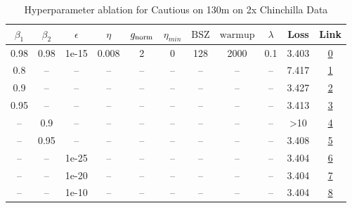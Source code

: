 \begin{table}[H]
\centering
\caption{Hyperparameter ablation for Cautious on 130m on 2x Chinchilla Data}
\label{tab:ablation_cautious_130m_on_2x_chinchilla_data}
\begin{tabular}{ccccccccccc}
\toprule
$\beta_1$ & $\beta_2$ & $\epsilon$ & $\eta$ & $g_{\mathrm{norm}}$ & $\eta_{min}$ & $\mathrm{BSZ}$ & $\mathrm{warmup}$ & $\lambda$ & Loss & Link \\
\midrule
0.98 & 0.98 & 1e-15 & 0.008 & 2 & 0 & 128 & 2000 & 0.1 & 3.403 & \href{https://wandb.ai/marin-community/optimizer-scaling/runs/sweep-130m-5B-cautiousce8123lr0.008-wd0.1-minlr0-warmup2000-b10.-fd1867}{0} \\
\midrule
0.8 & -- & -- & -- & -- & -- & -- & -- & -- & 7.417 & \href{https://wandb.ai/marin-community/optimizer-scaling/runs/sweep-130m-5B-cautious4f3b8flr0.008-wd0.1-minlr0-warmup2000-b10.-ef7ead}{1} \\
0.9 & -- & -- & -- & -- & -- & -- & -- & -- & 3.427 & \href{https://wandb.ai/marin-community/optimizer-scaling/runs/sweep-130m-5B-cautious585d63lr0.008-wd0.1-minlr0-warmup2000-b10.-6158ce}{2} \\
0.95 & -- & -- & -- & -- & -- & -- & -- & -- & 3.413 & \href{https://wandb.ai/marin-community/optimizer-scaling/runs/sweep-130m-5B-cautious5d7675lr0.008-wd0.1-minlr0-warmup2000-b10.-76a83d}{3} \\
-- & 0.9 & -- & -- & -- & -- & -- & -- & -- & >10 & \href{https://wandb.ai/marin-community/optimizer-scaling/runs/sweep-130m-5B-cautious6aa3ablr0.008-wd0.1-minlr0-warmup2000-b10.-752115}{4} \\
-- & 0.95 & -- & -- & -- & -- & -- & -- & -- & 3.408 & \href{https://wandb.ai/marin-community/optimizer-scaling/runs/sweep-130m-5B-cautious35372elr0.008-wd0.1-minlr0-warmup2000-b10.-681c2f}{5} \\
-- & -- & 1e-25 & -- & -- & -- & -- & -- & -- & 3.404 & \href{https://wandb.ai/marin-community/optimizer-scaling/runs/sweep-130m-5B-cautiousedcc52lr0.008-wd0.1-minlr0-warmup2000-b10.-57f831}{6} \\
-- & -- & 1e-20 & -- & -- & -- & -- & -- & -- & 3.404 & \href{https://wandb.ai/marin-community/optimizer-scaling/runs/sweep-130m-5B-cautious8f8214lr0.008-wd0.1-minlr0-warmup2000-b10.-b716f2}{7} \\
-- & -- & 1e-10 & -- & -- & -- & -- & -- & -- & 3.404 & \href{https://wandb.ai/marin-community/optimizer-scaling/runs/sweep-130m-5B-cautious78002elr0.008-wd0.1-minlr0-warmup2000-b10.-a041fe}{8} \\

\end{tabular}
\end{table}
